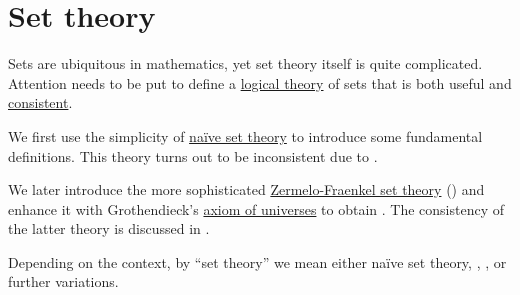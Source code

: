 \section{Set theory}\label{sec:set_theory}

Sets are ubiquitous in mathematics, yet set theory itself is quite complicated. Attention needs to be put to define a \hyperref[def:first_order_theory]{logical theory} of sets that is both useful and \hyperref[def:first_order_theory/consistent]{consistent}.

We first use the simplicity of \hyperref[def:naive_set_theory]{na\"ive set theory} to introduce some fundamental definitions. This theory turns out to be inconsistent due to .

We later introduce the more sophisticated \hyperref[def:zfc]{Zermelo-Fraenkel set theory} () and enhance it with Grothendieck's \hyperref[def:axiom_of_universes]{axiom of universes} to obtain . The consistency of the latter theory is discussed in .

Depending on the context, by \enquote{set theory} we mean either na\"ive set theory, , ,  or further variations.

